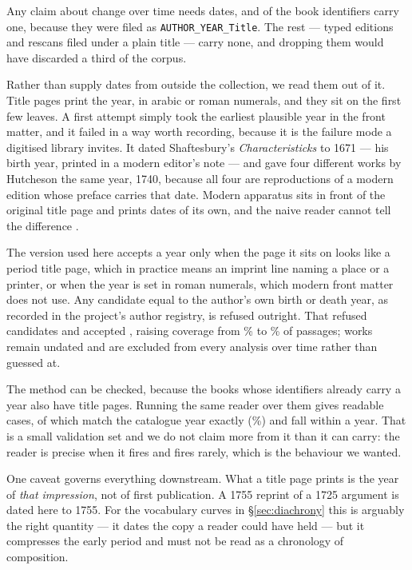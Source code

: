 Any claim about change over time needs dates, and \DatedById{} of the
\NBooks{} book identifiers carry one, because they were filed as
\texttt{AUTHOR\_YEAR\_Title}. The rest --- typed editions and rescans filed
under a plain title --- carry none, and dropping them would have discarded a
third of the corpus.

Rather than supply dates from outside the collection, we read them out of it.
Title pages print the year, in arabic or roman numerals, and they sit on the
first few leaves. A first attempt simply took the earliest plausible year in
the front matter, and it failed in a way worth recording, because it is the
failure mode a digitised library invites. It dated Shaftesbury's
\emph{Characteristicks} to 1671 --- his birth year, printed in a modern
editor's note --- and gave four different works by Hutcheson the same year,
1740, because all four are reproductions of a modern edition whose preface
carries that date. Modern apparatus sits in front of the original title page
and prints dates of its own, and the naive reader cannot tell the difference
\citep{cordell2017}.

The version used here accepts a year only when the page it sits on looks like
a period title page, which in practice means an imprint line naming a place or
a printer, or when the year is set in roman numerals, which modern front
matter does not use. Any candidate equal to the author's own birth or death
year, as recorded in the project's author registry, is refused outright. That
refused \DatesRefused{} candidates and accepted \DatesRecovered{}, raising
coverage from \CoverageBefore\% to \CoverageAfter\% of passages;
\StillUndated{} works remain undated and are excluded from every analysis over
time rather than guessed at.

The method can be checked, because the books whose identifiers already carry a
year also have title pages. Running the same reader over them gives
\DateCheckN{} readable cases, of which \DateCheckExact{} match the catalogue
year exactly (\DateCheckExactPct\%) and \DateCheckWithinOne{} fall within a
year. That is a small validation set and we do not claim more from it than it
can carry: the reader is precise when it fires and fires rarely, which is the
behaviour we wanted.

One caveat governs everything downstream. What a title page prints is the year
of \emph{that impression}, not of first publication. A 1755 reprint of a 1725
argument is dated here to 1755. For the vocabulary curves in
\S\ref{sec:diachrony} this is arguably the right quantity --- it dates the
copy a reader could have held --- but it compresses the early period and must
not be read as a chronology of composition.
